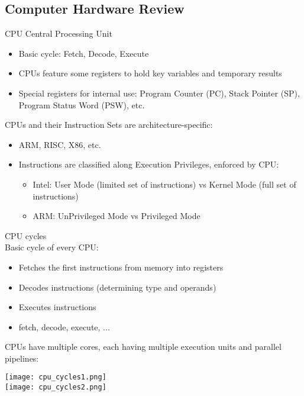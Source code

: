 \subsection{Computer Hardware Review}

\begin{definition}{CPU} Central Processing Unit\\
    \begin{itemize}
        \item Basic cycle: Fetch, Decode, Execute
        \item CPUs feature some registers to hold key variables and temporary results
        \item Special registers for internal use: Program Counter (PC), Stack Pointer (SP), Program Status Word (PSW), etc.
    \end{itemize}
    \vspace{2mm}
    CPUs and their Instruction Sets are architecture-specific:
    \begin{itemize}
        \item ARM, RISC, X86, etc.
        \item Instructions are classified along Execution Privileges, enforced by CPU:
        \begin{itemize}
            \item Intel: User Mode (limited set of instructions) vs Kernel Mode (full set of instructions)
            \item ARM: UnPrivileged Mode vs Privileged Mode
        \end{itemize}
    \end{itemize}
\end{definition}

\begin{concept}{CPU cycles}\\
    Basic cycle of every CPU:    
    \begin{itemize}
        \item Fetches the first instructions from memory into registers
        \item Decodes instructions (determining type and operands)
        \item Executes instructions
        \item fetch, decode, execute, ...
    \end{itemize}
CPUs have multiple cores, each having multiple execution units and parallel pipelines:

\texttt{[image: cpu\_cycles1.png]}\\
\texttt{[image: cpu\_cycles2.png]}
\end{concept}

